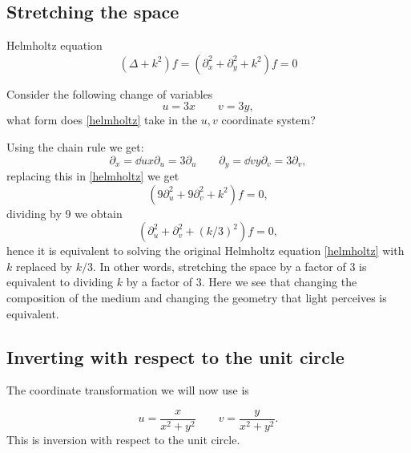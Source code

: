\subsection{Stretching the space}
Helmholtz equation
\begin{equation}\label{helmholtz}
	(\Delta +k^2)f=(\partial_x^2+\partial_y^2+k^2)f=0
\end{equation}

Consider the following change of variables
\begin{equation*}
	u=3x \qquad
	v=3y,
\end{equation*}
what form does \eqref{helmholtz} take in the \(u,v\) coordinate system?

Using the chain rule we get:
\begin{equation*}
	\partial_x=\dd{u}{x}\partial_u=3\partial_u \qquad
	\partial_y=\dd{v}{y}\partial_v=3\partial_v,
\end{equation*}
replacing this in \eqref{helmholtz} we get
\begin{equation*}
	(9\partial_u^2+9\partial_v^2+k^2)f=0,
\end{equation*}
dividing by 9 we obtain
\begin{equation*}
	(\partial_u^2+\partial_v^2+(k/3)^2)f=0,
\end{equation*}
hence it is equivalent to solving the original Helmholtz equation
\eqref{helmholtz} with \(k\) replaced by \(k/3\). In other words, stretching
the space by a factor of 3 is equivalent to dividing \(k\) by a factor of 3.
Here we see that changing the composition of the medium and changing the
geometry that light perceives is equivalent.

\subsection{Inverting with respect to the unit circle}
The coordinate transformation we will now use is

\begin{equation*}
	u=\frac{x}{x^2+y^2} \qquad
	v=\frac{y}{x^2+y^2}.
\end{equation*}
This is inversion with respect to the unit circle.

